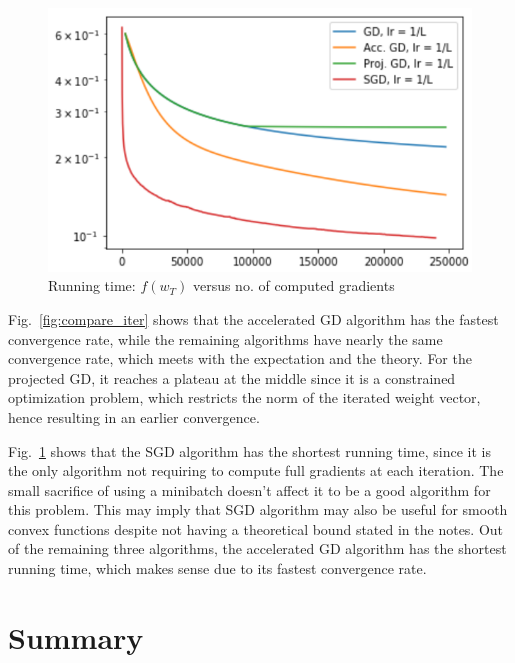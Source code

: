 \documentclass[10pt,conference,compsocconf]{IEEEtran}
\begin{document}
\begin{figure}[tbp]
  \centering
  \includegraphics[width=\columnwidth]{compare_time}
  \caption{Running time: $f(w_T)$ versus no. of computed gradients}
  \vspace{-3mm}
  \label{fig:compare_time}
\end{figure}
Fig.~\ref{fig:compare_iter} shows that the accelerated GD algorithm has the fastest convergence rate, while the remaining algorithms have nearly the same convergence rate, which meets with the expectation and the theory. For the projected GD, it reaches a plateau at the middle since it is a constrained optimization problem, which restricts the norm of the iterated weight vector, hence resulting in an earlier convergence.\par
Fig.~\ref{fig:compare_time} shows that the SGD algorithm has the shortest running time, since it is the only algorithm not requiring to compute full gradients at each iteration. The small sacrifice of using a minibatch doesn't affect it to be a good algorithm for this problem. This may imply that SGD algorithm may also be useful for smooth convex functions despite not having a theoretical bound stated in the notes. Out of the remaining three algorithms, the accelerated GD algorithm has the shortest running time, which makes sense due to its fastest convergence rate.

\section{Summary}
\end{document}
